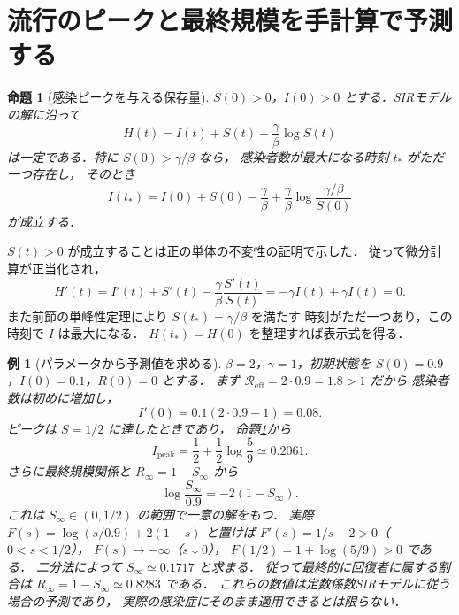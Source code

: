 \documentclass[a5paper,10pt,onecolumn]{jsarticle}
\makeatletter
\theoremstyle{mathnotetheorem}
\newtheorem{proposition}[theorem]{命題}
\newtheorem{example}[theorem]{例}
\renewcommand{\proofname}{証明}
\renewenvironment{proof}[1][\proofname]{%
  \par\pushQED{\qed}\normalfont\topsep4\p@\@plus2\p@\relax
  \trivlist\item[\hskip\labelsep\bfseries #1]\ignorespaces
}{\popQED\endtrivlist\@endpefalse}
\makeatother
\begin{document}
\section{流行のピークと最終規模を手計算で予測する}
\begin{proposition}[感染ピークを与える保存量]\label{prop:sir-invariant}
$S(0)>0$，$I(0)>0$ とする．SIRモデルの解に沿って
\[
 H(t)=I(t)+S(t)-\frac{\gamma}{\beta}\log S(t)
\]
は一定である．特に $S(0)>\gamma/\beta$ なら，
感染者数が最大になる時刻 $t_*$ がただ一つ存在し，
そのとき
\[
 I(t_*)=I(0)+S(0)-\frac{\gamma}{\beta}
        +\frac{\gamma}{\beta}
          \log\frac{\gamma/\beta}{S(0)}
\]
が成立する．
\end{proposition}
\begin{proof}
$S(t)>0$ が成立することは正の単体の不変性の証明で示した．
従って微分計算が正当化され，
\[
 H'(t)=I'(t)+S'(t)
       -\frac{\gamma}{\beta}\frac{S'(t)}{S(t)}
       =-\gamma I(t)+\gamma I(t)=0.
\]
また前節の単峰性定理により $S(t_*)=\gamma/\beta$ を満たす
時刻がただ一つあり，この時刻で $I$ は最大になる．
$H(t_*)=H(0)$ を整理すれば表示式を得る．
\end{proof}
\begin{example}[パラメータから予測値を求める]\label{ex:sir-prediction}
$\beta=2$，$\gamma=1$，初期状態を
$S(0)=0.9$，$I(0)=0.1$，$R(0)=0$ とする．
まず $\mathcal R_{\mathrm{eff}}=2\cdot0.9=1.8>1$ だから
感染者数は初めに増加し，
\[
 I'(0)=0.1(2\cdot0.9-1)=0.08.
\]
ピークは $S=1/2$ に達したときであり，
命題\ref{prop:sir-invariant}から
\[
 I_{\mathrm{peak}}
 =\frac12+\frac12\log\frac59
 \simeq0.2061.
\]
さらに最終規模関係と $R_\infty=1-S_\infty$ から
\[
 \log\frac{S_\infty}{0.9}=-2(1-S_\infty).
\]
これは $S_\infty\in(0,1/2)$ の範囲で一意の解をもつ．
実際 $F(s)=\log(s/0.9)+2(1-s)$ と置けば
$F'(s)=1/s-2>0$（$0<s<1/2$），
$F(s)\to-\infty$（$s\downarrow0$），
$F(1/2)=1+\log(5/9)>0$ である．
二分法によって $S_\infty\simeq0.1717$ と求まる．
従って最終的に回復者に属する割合は
$R_\infty=1-S_\infty\simeq0.8283$ である．
これらの数値は\emph{定数係数SIRモデルに従う場合}の予測であり，
実際の感染症にそのまま適用できるとは限らない．
\end{example}
\end{document}
